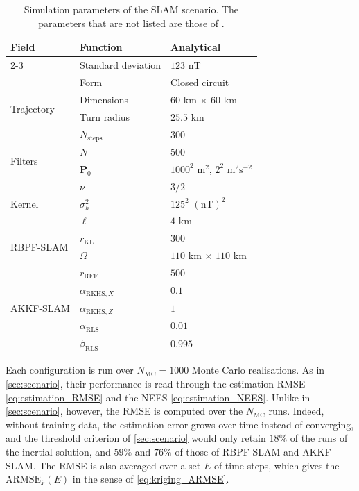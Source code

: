 \begin{table}[!htb]
	\centering
	\begin{tabular}{|l|l|l|}\hline
		\multirow{2}{*}{Field}&Function&Analytical\\\cline{2-3}
		&Standard deviation&$123$ nT\\\hline
		\multirow{4}{*}{Trajectory}&Form&Closed circuit\\\cline{2-3}
		&Dimensions&$60$ km $\times$ $60$ km\\\cline{2-3}
		&Turn radius&$25.5$ km\\\cline{2-3}
		&$N_\mathrm{steps}$&$300$\\\hline
		\multirow{2}{*}{Filters}&$N$&$500$\\\cline{2-3}
		&$\mathbf{P}_0$&$1000^2\text{ m}^2$, $2^2\text{ m}^2\text{s}^{-2}$\\\hline
		\multirow{3}{*}{Kernel}&$\nu$&$3/2$\\\cline{2-3}
		&$\sigma_h^2$&$125^2$ $(\text{nT})^2$\\\cline{2-3}
		&$\ell$&$4$ km\\\hline
		\multirow{2}{*}{RBPF-SLAM}&$r_{\mathrm{KL}}$&$300$\\\cline{2-3}
		&$\Omega$&$110$ km $\times$ $110$ km\\\hline
		\multirow{5}{*}{AKKF-SLAM}&$r_{\mathrm{RFF}}$&$500$\\\cline{2-3}
		&$\alpha_{\mathrm{RKHS},X}$&$0.1$\\\cline{2-3}
		&$\alpha_{\mathrm{RKHS},Z}$&$1$\\\cline{2-3}
		&$\alpha_{\mathrm{RLS}}$&$0.01$\\\cline{2-3}
		&$\beta_{\mathrm{RLS}}$&$0.995$\\\hline
	\end{tabular}
	\caption{Simulation parameters of the SLAM scenario. The parameters that are not listed are those of .}\label{tab:SLAM_scenario}
\end{table}

Each configuration is run over $N_\mathrm{MC}=1000$ Monte Carlo realisations. As in \cref{sec:scenario}, their performance is read through the estimation RMSE \eqref{eq:estimation_RMSE} and the NEES \eqref{eq:estimation_NEES}. Unlike in \cref{sec:scenario}, however, the RMSE is computed over the $N_\mathrm{MC}$ runs. Indeed, without training data, the estimation error grows over time instead of converging, and the threshold criterion of \cref{sec:scenario} would only retain $18\%$ of the runs of the inertial solution, and $59\%$ and $76\%$ of those of RBPF-SLAM and AKKF-SLAM. The RMSE is also averaged over a set $E$ of time steps, which gives the $\mathrm{ARMSE}_{\hat{x}}(E)$ in the sense of \eqref{eq:kriging_ARMSE}.

